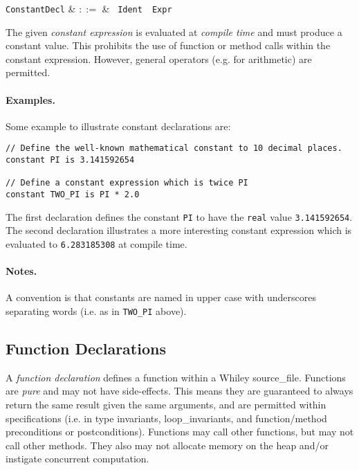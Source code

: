 \begin{syntax}
  \verb+ConstantDecl+ & $::=$ & \ \verb+Ident+\
  \ \verb+Expr+\\
\end{syntax}

The given {\em constant expression} is evaluated at {\em compile time}
and must produce a constant value.  This prohibits the use of function
or method calls within the constant expression.  However, general
operators (e.g. for arithmetic) are permitted.

\paragraph{Examples.}  Some example to illustrate constant
declarations are:

\begin{lstlisting}
// Define the well-known mathematical constant to 10 decimal places.
constant PI is 3.141592654

// Define a constant expression which is twice PI
constant TWO_PI is PI * 2.0
\end{lstlisting}

The first declaration defines the constant \lstinline{PI} to have the
\lstinline{real} value \lstinline{3.141592654}.  The second
declaration illustrates a more interesting constant expression which
is evaluated to \lstinline{6.283185308} at compile time.

\paragraph{Notes.}  A convention is that constants are named in upper
case with underscores separating words (i.e. as in \lstinline{TWO_PI}
above).


\subsection{Function Declarations}

A {\em function declaration} defines a function within a Whiley
\gls{source_file}.  Functions are {\em pure} and may not have
side-effects.  This means they are guaranteed to always return the
same result given the same arguments, and are permitted within
specifications (i.e. in type invariants, \gls{loop_invariant}s, and
function/method \gls{precondition}s or \gls{postcondition}s).
Functions may call other functions, but may not call other methods.
They also may not allocate memory on the heap and/or instigate
concurrent computation.

